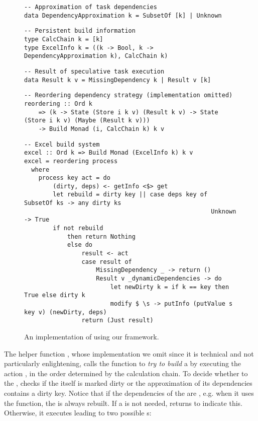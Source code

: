 \begin{figure}
\begin{verbatim}
-- Approximation of task dependencies
data DependencyApproximation k = SubsetOf [k] | Unknown
\end{verbatim}
\vspace{1mm}
\begin{verbatim}
-- Persistent build information
type CalcChain k = [k]
type ExcelInfo k = ((k -> Bool, k -> DependencyApproximation k), CalcChain k)
\end{verbatim}
\vspace{1mm}
\begin{verbatim}
-- Result of speculative task execution
data Result k v = MissingDependency k | Result v [k]
\end{verbatim}
\vspace{1mm}
\begin{verbatim}
-- Reordering dependency strategy (implementation omitted)
reordering :: Ord k
    => (k -> State (Store i k v) (Result k v) -> State (Store i k v) (Maybe (Result k v)))
    -> Build Monad (i, CalcChain k) k v
\end{verbatim}
\vspace{1mm}
\begin{verbatim}
-- Excel build system
excel :: Ord k => Build Monad (ExcelInfo k) k v
excel = reordering process
  where
    process key act = do
        (dirty, deps) <- getInfo <$> get
        let rebuild = dirty key || case deps key of SubsetOf ks -> any dirty ks
                                                    Unknown     -> True
        if not rebuild
            then return Nothing
            else do
                result <- act
                case result of
                    MissingDependency _ -> return ()
                    Result v _dynamicDependencies -> do
                        let newDirty k = if k == key then True else dirty k
                        modify $ \s -> putInfo (putValue s key v) (newDirty, deps)
                return (Just result)
\end{verbatim}
\vspace{-2mm}
\caption{An implementation of \Excel using our framework.}\label{fig-excel-implementation}
\vspace{-2mm}
\end{figure}

The helper function , whose implementation we omit since it is
technical and not particularly enlightening, calls the function  to
\emph{try to build} a  by executing the action , in the order
determined by the calculation chain. To decide whether to  the
,  checks if the  itself is marked dirty or the
approximation of its dependencies contains a dirty key. Notice that if the
dependencies of the  are , e.g. when it uses the
 function, the  is always rebuilt. If a  is
not needed,  returns  to indicate this. Otherwise, it
executes  leading to two possible s:

